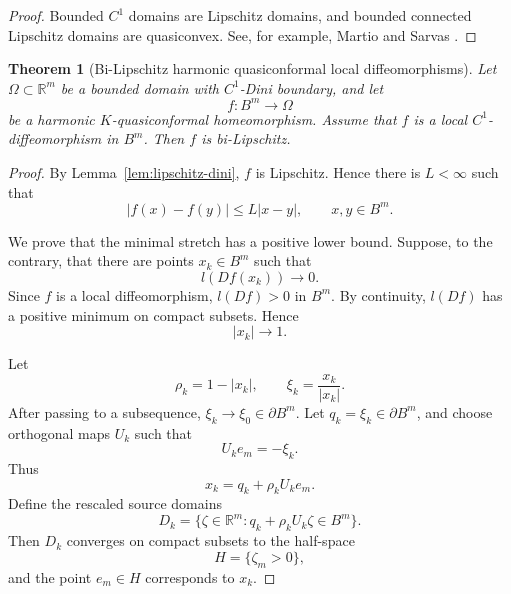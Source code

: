 \documentclass[11pt]{amsart}
\newtheorem{theorem}{Theorem}
\theoremstyle{definition}
\theoremstyle{remark}
\newcommand{\R}{\mathbb R}
\begin{document}
\begin{proof}
Bounded \(C^1\) domains are Lipschitz domains, and bounded connected
Lipschitz domains are quasiconvex. See, for example, Martio and Sarvas
\cite{MartioSarvas1979}.
\end{proof}

\begin{theorem}[Bi-Lipschitz harmonic quasiconformal local diffeomorphisms]
\label{th:harmonic-qc-local-diffeo-bilip}
Let \(\Omega\subset\R^m\) be a bounded domain with \(C^1\)-Dini boundary,
and let
\[
        f:B^m\to\Omega
\]
be a harmonic \(K\)-quasiconformal homeomorphism. Assume that \(f\) is a
local \(C^1\)-diffeomorphism in \(B^m\). Then \(f\) is bi-Lipschitz.
\end{theorem}

\begin{proof}
By Lemma~\ref{lem:lipschitz-dini}, \(f\) is Lipschitz.  Hence there is
\(L<\infty\) such that
\[
        |f(x)-f(y)|\le L|x-y|,
        \qquad x,y\in B^m.
\]

We prove that the minimal stretch has a positive lower bound. Suppose, to
the contrary, that there are points \(x_k\in B^m\) such that
\[
        l(Df(x_k))\to0.
\]
Since \(f\) is a local diffeomorphism, \(l(Df)>0\) in \(B^m\).  By
continuity, \(l(Df)\) has a positive minimum on compact subsets.  Hence
\[
        |x_k|\to1.
\]

Let
\[
        \rho_k=1-|x_k|,
        \qquad
        \xi_k=\frac{x_k}{|x_k|}.
\]
After passing to a subsequence, \(\xi_k\to\xi_0\in\partial B^m\).  Let
\(q_k=\xi_k\in\partial B^m\), and choose orthogonal maps \(U_k\) such that
\[
        U_k e_m=-\xi_k.
\]
Thus
\[
        x_k=q_k+\rho_k U_k e_m.
\]
Define the rescaled source domains
\[
        D_k=\{\zeta\in\R^m:q_k+\rho_k U_k\zeta\in B^m\}.
\]
Then \(D_k\) converges on compact subsets to the half-space
\[
        H=\{\zeta_m>0\},
\]
and the point \(e_m\in H\) corresponds to \(x_k\).


\end{proof}
\end{document}
